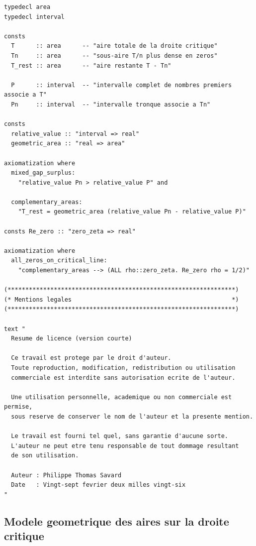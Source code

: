 \documentclass[a4paper,11pt]{article}
\begin{document}
\begin{holcode}[title={\textcolor{white}{Fichier : methode\_spectral.thy -- Partie 6/6 (FIN)}}]
\begin{lstlisting}
typedecl area
typedecl interval

consts
  T      :: area      -- "aire totale de la droite critique"
  Tn     :: area      -- "sous-aire T/n plus dense en zeros"
  T_rest :: area      -- "aire restante T - Tn"

  P      :: interval  -- "intervalle complet de nombres premiers associe a T"
  Pn     :: interval  -- "intervalle tronque associe a Tn"

consts
  relative_value :: "interval => real"
  geometric_area :: "real => area"

axiomatization where
  mixed_gap_surplus:
    "relative_value Pn > relative_value P" and

  complementary_areas:
    "T_rest = geometric_area (relative_value Pn - relative_value P)"

consts Re_zero :: "zero_zeta => real"

axiomatization where
  all_zeros_on_critical_line:
    "complementary_areas --> (ALL rho::zero_zeta. Re_zero rho = 1/2)"

(****************************************************************)
(* Mentions legales                                             *)
(****************************************************************)

text "
  Resume de licence (version courte)

  Ce travail est protege par le droit d'auteur.
  Toute reproduction, modification, redistribution ou utilisation
  commerciale est interdite sans autorisation ecrite de l'auteur.

  Une utilisation personnelle, academique ou non commerciale est permise,
  sous reserve de conserver le nom de l'auteur et la presente mention.

  Le travail est fourni tel quel, sans garantie d'aucune sorte.
  L'auteur ne peut etre tenu responsable de tout dommage resultant
  de son utilisation.

  Auteur : Philippe Thomas Savard
  Date   : Vingt-sept fevrier deux milles vingt-six
"
\end{lstlisting}
\end{holcode}


\subsection*{Modele geometrique des aires sur la droite critique}
\end{document}
